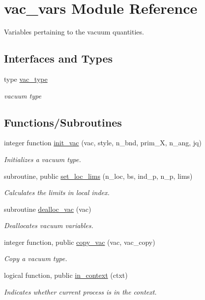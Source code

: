 \hypertarget{namespacevac__vars}{}\section{vac\+\_\+vars Module Reference}
\label{namespacevac__vars}


Variables pertaining to the vacuum quantities.  


\subsection*{Interfaces and Types}
\begin{DoxyCompactItemize}
\item 
type \hyperlink{structvac__vars_1_1vac__type}{vac\+\_\+type}
\begin{DoxyCompactList}\small\item\em vacuum type \end{DoxyCompactList}\end{DoxyCompactItemize}
\subsection*{Functions/\+Subroutines}
\begin{DoxyCompactItemize}
\item 
integer function \hyperlink{namespacevac__vars_a81df0b01b0c2bf8072453f4ca12e2d5e}{init\+\_\+vac} (vac, style, n\+\_\+bnd, prim\+\_\+X, n\+\_\+ang, jq)
\begin{DoxyCompactList}\small\item\em Initializes a vacuum type. \end{DoxyCompactList}\item 
subroutine, public \hyperlink{namespacevac__vars_a5bfa31e3a61464281d70a4e1a8246510}{set\+\_\+loc\+\_\+lims} (n\+\_\+loc, bs, ind\+\_\+p, n\+\_\+p, lims)
\begin{DoxyCompactList}\small\item\em Calculates the limits in local index. \end{DoxyCompactList}\item 
subroutine \hyperlink{namespacevac__vars_aa6669ed787cf96e8f8fa665149bc83a3}{dealloc\+\_\+vac} (vac)
\begin{DoxyCompactList}\small\item\em Deallocates vacuum variables. \end{DoxyCompactList}\item 
integer function, public \hyperlink{namespacevac__vars_a8da702035bfcc208bd810258f9944f6a}{copy\+\_\+vac} (vac, vac\+\_\+copy)
\begin{DoxyCompactList}\small\item\em Copy a vacuum type. \end{DoxyCompactList}\item 
logical function, public \hyperlink{namespacevac__vars_af0fd2f819434bf7adc494753df4af19c}{in\+\_\+context} (ctxt)
\begin{DoxyCompactList}\small\item\em Indicates whether current process is in the context. \end{DoxyCompactList}\end{DoxyCompactItemize}

